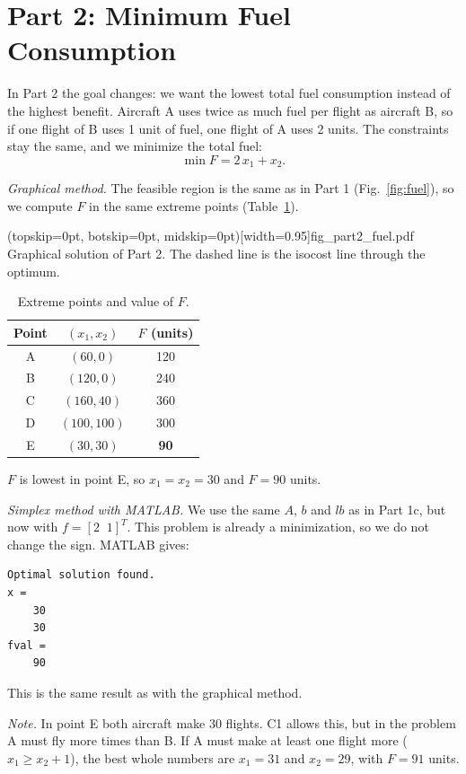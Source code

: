 \documentclass{ieeeaccess}
\begin{document}
\section{Part 2: Minimum Fuel Consumption}
In Part 2 the goal changes: we want the lowest total fuel consumption instead
of the highest benefit. Aircraft A uses twice as much fuel per flight as
aircraft B, so if one flight of B uses 1 unit of fuel, one flight of A uses
2 units. The constraints stay the same, and we minimize the total fuel:
\[
  \min F = 2\,x_1 + x_2 .
\]

\textit{Graphical method.} The feasible region is the same as in Part 1
(Fig.~\ref{fig:fuel}), so we compute $F$ in the same extreme points
(Table~\ref{tab:fuel}).

\Figure[t!](topskip=0pt, botskip=0pt, midskip=0pt)[width=0.95\columnwidth]{fig_part2_fuel.pdf}
{Graphical solution of Part 2. The dashed line is the isocost line through
the optimum.\label{fig:fuel}}

\begin{table}[h]
\centering
\caption{Extreme points and value of $F$.}
\label{tab:fuel}
\begin{tabular}{ccc}
\hline
Point & $(x_1, x_2)$ & $F$ (units) \\
\hline
A & $(60, 0)$    & 120 \\
B & $(120, 0)$   & 240 \\
C & $(160, 40)$  & 360 \\
D & $(100, 100)$ & 300 \\
E & $(30, 30)$   & \textbf{90} \\
\hline
\end{tabular}
\end{table}

$F$ is lowest in point E, so $x_1 = x_2 = 30$ and $F = 90$ units.

\textit{Simplex method with MATLAB.} We use the same $A$, $b$ and $lb$ as in
Part 1c, but now with $f = [2 \;\; 1]^T$. This problem is already a
minimization, so we do not change the sign. MATLAB gives:
\begin{verbatim}
Optimal solution found.
x =
    30
    30
fval =
    90
\end{verbatim}
This is the same result as with the graphical method.

\textit{Note.} In point E both aircraft make 30 flights. C1 allows this, but
in the problem A must fly more times than B. If A must make at least
one flight more ($x_1 \ge x_2 + 1$), the best whole numbers are $x_1 = 31$
and $x_2 = 29$, with $F = 91$ units.
\end{document}
